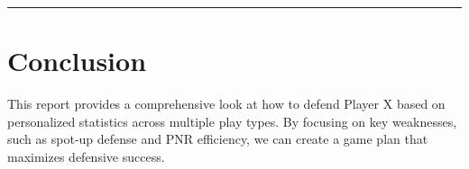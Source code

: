 \documentclass[a4paper,12pt]{article}
\begin{document}
\vspace{0em} %
\hrule height 1pt width 1\textwidth %
\vspace{1em} %

\clearpage


\section*{Conclusion}
This report provides a comprehensive look at how to defend Player X based on personalized statistics across multiple play types. By focusing on key weaknesses, such as spot-up defense and PNR efficiency, we can create a game plan that maximizes defensive success.
\end{document}
